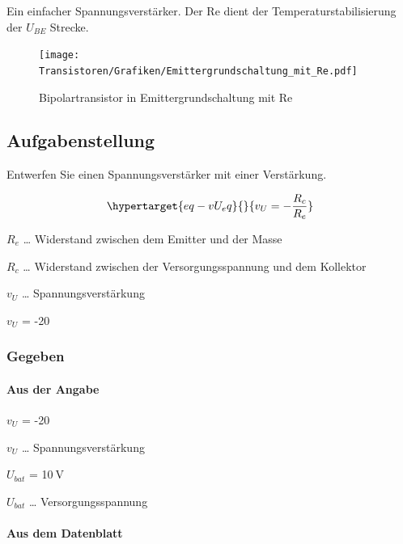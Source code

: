 \documentclass[
  letterpaper,
  DIV=11]{scrreprt}
\let\oldparagraph\paragraph
\renewcommand{\paragraph}[1]{\oldparagraph{#1}\mbox{}}
\begin{document}
Ein einfacher Spannungsverstärker. Der Re dient der
Temperaturstabilisierung der \(U_{BE}\) Strecke.

\begin{figure}

{\centering \texttt{[image: Transistoren/Grafiken/Emittergrundschaltung\_mit\_Re.pdf]}

}

\caption{\label{fig-BJT_Emitter_mit_Re}Bipolartransistor in
Emittergrundschaltung mit Re}

\end{figure}

\hypertarget{aufgabenstellung}{%
\subsection{Aufgabenstellung}\label{aufgabenstellung}}

Entwerfen Sie einen Spannungsverstärker mit einer Verstärkung.

\begin{equation}\protect\hypertarget{eq-vU_eq}{}{
v_{U} = - \frac{R_{c}}{R_{e}}
}\label{eq-vU_eq}\end{equation}

\(R_{e}\) \ldots{} Widerstand zwischen dem Emitter und der Masse

\(R_{c}\) \ldots{} Widerstand zwischen der Versorgungsspannung und dem
Kollektor

\(v_{U}\) \ldots{} Spannungsverstärkung

\(v_{U}\) = -20\(\ \mathtt{\text{}}\)

\hypertarget{gegeben}{%
\subsubsection{Gegeben}\label{gegeben}}

\hypertarget{aus-der-angabe}{%
\paragraph{Aus der Angabe}\label{aus-der-angabe}}

\(v_{U}\) = -20\(\ \mathtt{\text{}}\)

\(v_{U}\) \ldots{} Spannungsverstärkung

\(U_{bat}\) = 10\(\ \text{V}\)

\(U_{bat}\) \ldots{} Versorgungsspannung

\hypertarget{aus-dem-datenblatt}{%
\paragraph{Aus dem Datenblatt}\label{aus-dem-datenblatt}}
\end{document}
